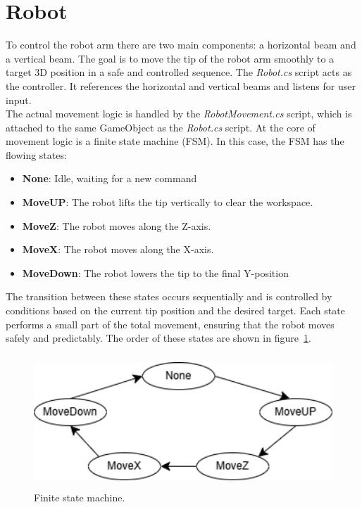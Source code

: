 \documentclass{report}
\begin{document}
\section{Robot}
To control the robot arm there are two main components: a horizontal beam and a vertical beam. The goal is to move the tip of the robot arm smoothly to a target 3D position in a safe and controlled sequence. The \textit{Robot.cs} script acts as the controller.  It references the horizontal and vertical beams and listens for user input. \\ %
The actual movement logic is handled by the \textit{RobotMovement.cs} script, which is attached to the same GameObject as the \textit{Robot.cs} script. At the core of movement logic is a finite state machine (FSM). In this case, the FSM has the flowing states:
\begin{itemize}
    \item \textbf{None}: Idle, waiting for a new command
    \item \textbf{MoveUP}: The robot lifts the tip vertically to clear the workspace.
    \item \textbf{MoveZ}: The robot moves along the Z-axis.
    \item \textbf{MoveX}: The robot moves along the X-axis.
    \item \textbf{MoveDown}: The robot lowers the tip to the final Y-position
\end{itemize}
The transition between these states occurs sequentially and is controlled by conditions based on the current tip position and the desired target. Each state performs a small part of the total movement, ensuring that the robot moves safely and predictably. The order of these states are shown in figure~\ref{fig:FSM}.

\begin{figure}[H]
\centering
\includegraphics[height=50mm, keepaspectratio]{report_images/diagram.drawio.png}
\caption{Finite state machine.}
\label{fig:FSM}
\end{figure}
\end{document}
